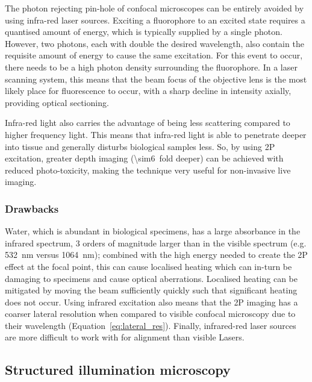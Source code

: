 The photon rejecting pin-hole of \gls{confocal microscope}s can be entirely avoided by using infra-red laser sources.
Exciting a \gls{fluorophore} to an excited state requires a quantised amount of energy, which is typically supplied by a single photon.
However, two photons, each with double the desired wavelength, also contain the requisite amount of energy to cause the same excitation.
For this event to occur, there needs to be a high photon density surrounding the \gls{fluorophore}.
In a laser scanning system, this means that the beam focus of the \gls{objective lens} is the most likely place for fluorescence to occur, with a sharp decline in intensity axially, providing optical sectioning.

Infra-red light also carries the advantage of being less scattering compared to higher frequency light.
This means that infra-red light is able to penetrate deeper into tissue and generally disturbs biological samples less.
So, by using \gls{2P} excitation, greater depth imaging (\SI{\sim6}{fold} deeper) can be achieved with reduced \gls{photo-toxicity}, making the technique very useful for non-invasive live imaging.

\subsubsection{Drawbacks} %

Water, which is abundant in biological specimens, has a large absorbance in the infrared spectrum, 3 orders of magnitude larger than in the visible spectrum (e.g. \SI{532}{\nano\meter} versus \SI{1064}{\nano\meter});
combined with the high energy needed to create the \gls{2P} effect at the focal point, this can cause localised heating which can in-turn be damaging to specimens and cause optical \gls{aberration}s.
Localised heating can be mitigated by moving the beam sufficiently quickly such that significant heating does not occur.
Using infrared excitation also means that the \gls{2P} imaging has a coarser lateral resolution when compared to visible confocal microscopy due to their wavelength (Equation~\eqref{eq:lateral_res}).
Finally, infrared-red laser sources are more difficult to work with for alignment than visible \gls{Laser}s.

\subsection{Structured illumination microscopy}\label{sec:SIM_theory}

